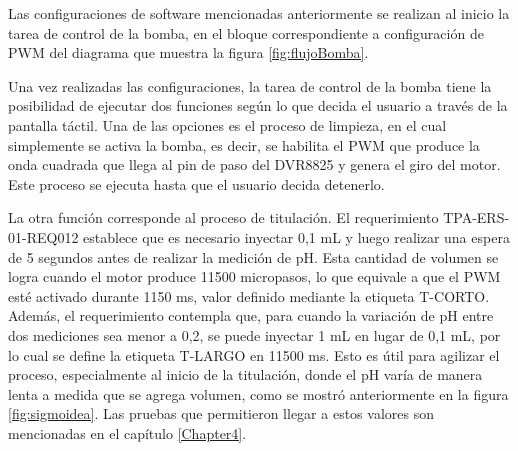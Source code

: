 Las configuraciones de software mencionadas anteriormente se realizan al inicio la tarea de control de la bomba, en el bloque correspondiente a configuración de PWM del diagrama que muestra la figura \ref{fig:flujoBomba}.

Una vez realizadas las configuraciones, la tarea de control de la bomba tiene la posibilidad de ejecutar dos funciones según lo que decida el usuario a través de la pantalla táctil. Una de las opciones es el proceso de limpieza, en el cual simplemente se activa la bomba, es decir, se habilita el PWM que produce la onda cuadrada que llega al pin de paso del DVR8825 y genera el giro del motor. Este proceso se ejecuta hasta que el usuario decida detenerlo.

La otra función corresponde al proceso de titulación. El requerimiento TPA-ERS-01-REQ012 establece que es necesario inyectar 0,1 mL y luego realizar una espera de 5 segundos antes de realizar la medición de pH. Esta cantidad de volumen se logra cuando el motor produce 11500 micropasos, lo que equivale a que el PWM esté activado durante 1150 ms, valor definido mediante la etiqueta T-CORTO. Además, el requerimiento contempla que, para cuando la variación de pH entre dos mediciones  sea menor a 0,2, se puede inyectar 1 mL en lugar de 0,1 mL, por lo cual se define la etiqueta T-LARGO en 11500 ms. Esto es útil para agilizar el proceso, especialmente al inicio de la titulación, donde el pH varía de manera lenta a medida que se agrega volumen, como se mostró anteriormente en la figura \ref{fig:sigmoidea}. Las pruebas que permitieron llegar a estos valores son mencionadas en el capítulo \ref{Chapter4}.

